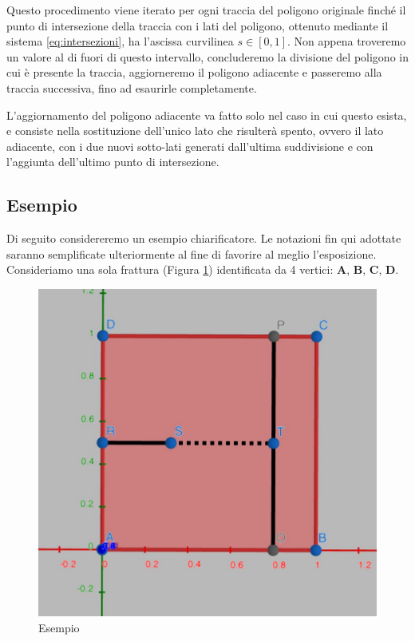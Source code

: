 \documentclass[a4paper]{article}
\newcommand{\B}{\mathbf}
\begin{document}
Questo procedimento viene iterato per ogni traccia del poligono originale finché il punto di intersezione della traccia con i lati del poligono, ottenuto mediante il sistema \eqref{eq:intersezioni}, ha l'ascissa curvilinea $s \in [0,1]$. Non appena troveremo un valore al di fuori di questo intervallo, concluderemo la divisione del poligono in cui è presente la traccia, aggiorneremo il poligono adiacente e passeremo alla traccia successiva, fino ad esaurirle completamente.

L'aggiornamento del poligono adiacente va fatto solo nel caso in cui questo esista, e consiste nella sostituzione dell'unico lato che risulterà spento, ovvero il lato adiacente, con i due nuovi sotto-lati generati dall'ultima suddivisione e con l'aggiunta dell'ultimo punto di intersezione.




\subsection{Esempio}
Di seguito considereremo un esempio chiarificatore. Le notazioni fin qui adottate saranno semplificate ulteriormente al fine di favorire al meglio l'esposizione. Consideriamo una sola frattura (Figura \ref{fig:esempio}) identificata da 4 vertici: $\B A$, $\B B$, $\B C$, $\B D$. 

\begin{figure}[h]
    \centering
    \includegraphics[width=11.5 cm]{im1.jpeg}
    \caption{Esempio}
    \label{fig:esempio}
\end{figure}
\end{document}
